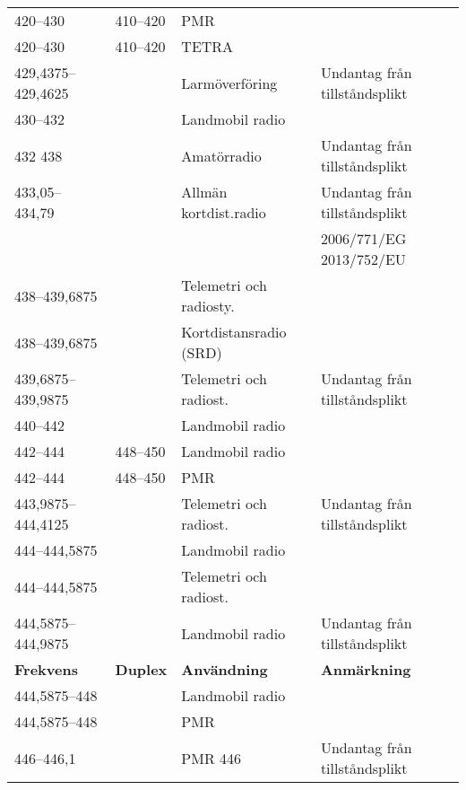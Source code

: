 \documentclass[10pt,swedish,a4paper,twoside]{article}
\begin{document}
\begin{landscape}
\begin{longtable}{llll}
	420--430           & 410--420           & PMR                     &  \\
	420--430           & 410--420           & TETRA                   &  \\
	429,4375--429,4625 &                    & Larmöverföring          & Undantag från tillståndsplikt            \\
	430--432           &                    & Landmobil radio         &  \\
	432	438            &                    & Amatörradio             & Undantag från tillståndsplikt            \\
	433,05--434,79     &                    & Allmän kortdist.radio   & Undantag från tillståndsplikt            \\
	                   &                    &                         & 2006/771/EG 2013/752/EU                  \\
	438--439,6875      &                    & Telemetri och radiosty. &  \\
	438--439,6875      &                    & Kortdistansradio (SRD)  &  \\
	439,6875--439,9875 &                    & Telemetri och radiost.  & Undantag från tillståndsplikt            \\
	440--442           &                    & Landmobil radio         &  \\
	442--444           & 448--450           & Landmobil radio         &  \\
	442--444           & 448--450           & PMR                     &  \\
	443,9875--444,4125 &                    & Telemetri och radiost.  & Undantag från tillståndsplikt            \\
	444--444,5875      &                    & Landmobil radio         &  \\
	444--444,5875      &                    & Telemetri och radiost.  &  \\
	444,5875--444,9875 &                    & Landmobil radio         & Undantag från tillståndsplikt            \\
	\textbf{Frekvens}  & \textbf{Duplex}    & \textbf{Användning}     & \textbf{Anmärkning}                      \\ \hline
	444,5875--448      &                    & Landmobil radio         &  \\
	444,5875--448      &                    & PMR                     &  \\
	446--446,1         &                    & PMR 446                 & Undantag från tillståndsplikt            \\

\end{longtable}
\end{landscape}
\end{document}
